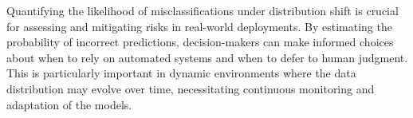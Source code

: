 Quantifying the likelihood of misclassifications under distribution shift is crucial for assessing and mitigating risks in real-world deployments. By estimating the probability of incorrect predictions, decision-makers can make informed choices about when to rely on automated systems and when to defer to human judgment. This is particularly important in dynamic environments where the data distribution may evolve over time, necessitating continuous monitoring and adaptation of the models.





